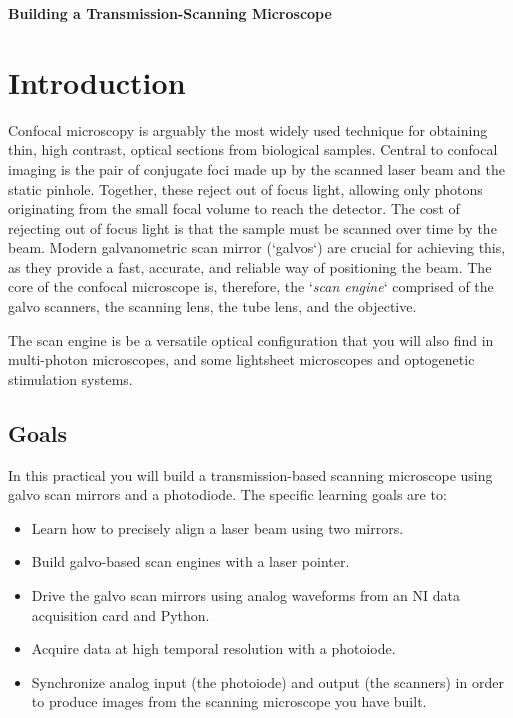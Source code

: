 \documentclass[a4paper]{report}
\begin{document}
\setcounter{secnumdepth}{2}

\begin{center}
\textbf{\Large{Building a Transmission-Scanning Microscope}}
\end{center}

\section{Introduction}
Confocal microscopy is arguably the most widely used technique for obtaining thin, high contrast, optical sections from biological samples. 
Central to confocal imaging is the pair of conjugate foci made up by the scanned laser beam and the static pinhole. 
Together, these reject out of focus light, allowing only photons originating from the small focal volume to reach the detector. 
The cost of rejecting out of focus light is that the sample must be scanned over time by the beam. 
Modern galvanometric scan mirror (`galvos`) are crucial for achieving this, as they provide a fast, accurate, and reliable way of positioning the beam. 
The core of the confocal microscope is, therefore, the `\emph{scan engine}` comprised of the galvo scanners, the scanning lens, the tube lens, and the objective. 
\vspace{0.75em}

The scan engine is be a versatile optical configuration that you will also find in multi-photon microscopes, and some lightsheet microscopes and optogenetic stimulation systems. 

\subsection{Goals}
In this practical you will build a transmission-based scanning microscope using galvo scan mirrors and a photodiode. 
The specific learning goals are to:

\begin{itemize}
\setlength\itemsep{0.15em}
\item Learn how to precisely align a laser beam using two mirrors.
\item Build galvo-based scan engines with a laser pointer.
\item Drive the galvo scan mirrors using analog waveforms from an NI data acquisition card and Python.
\item Acquire data at high temporal resolution with a photoiode.
\item Synchronize analog input (the photoiode) and output (the scanners) in order to produce images from the scanning microscope you have built. 
\end{itemize}
\end{document}

